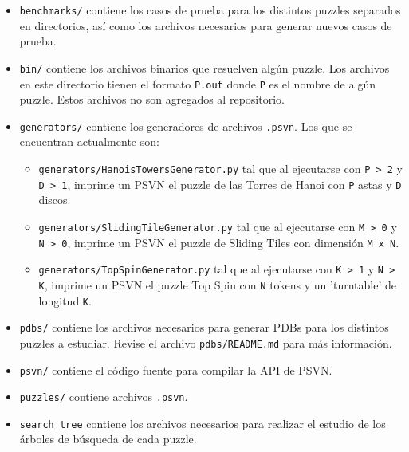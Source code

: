 \documentclass[a4paper,10pt]{article}
\begin{document}
  \begin{itemize}
    \item \verb|benchmarks/| contiene los casos de prueba para los distintos 
    puzzles separados en directorios, as\'i como los archivos necesarios para 
    generar nuevos casos de prueba.
  
    \item \verb|bin/| contiene los archivos binarios que resuelven alg\'un puzzle.
    Los archivos en este directorio tienen el formato \verb|P.out| donde \verb|P|
    es el nombre de alg\'un puzzle. Estos archivos no son agregados al repositorio.

    \item \verb|generators/| contiene los generadores de archivos \verb|.psvn|.
    Los que se encuentran actualmente son:
    \begin{itemize}
      \item \verb|generators/HanoisTowersGenerator.py| tal que al ejecutarse con 
      \verb|P > 2| y \verb|D > 1|, imprime un PSVN el puzzle de las Torres 
      de Hanoi con \verb|P| astas y \verb|D| discos.

      \item \verb|generators/SlidingTileGenerator.py| tal que al ejecutarse con 
      \verb|M > 0| y \verb|N > 0|, imprime un PSVN el puzzle de Sliding 
      Tiles con dimensi\'on \verb|M x N|.

      \item \verb|generators/TopSpinGenerator.py| tal que al ejecutarse con 
      \verb|K > 1| y \verb|N > K|, imprime un PSVN el puzzle Top Spin con 
      \verb|N| tokens y un 'turntable' de longitud \verb|K|.
    \end{itemize}

    \item \verb|pdbs/| contiene los archivos necesarios para generar PDBs para los 
    distintos puzzles a estudiar. Revise el archivo \verb|pdbs/README.md| para m\'as
    informaci\'on.

    \item \verb|psvn/| contiene el c\'odigo fuente para compilar la API de PSVN.
    
    \item \verb|puzzles/| contiene archivos \verb|.psvn|.
    
    \item \verb|search_tree| contiene los archivos necesarios para realizar el estudio
    de los \'arboles de b\'usqueda de cada puzzle.


\end{itemize}
\end{document}
